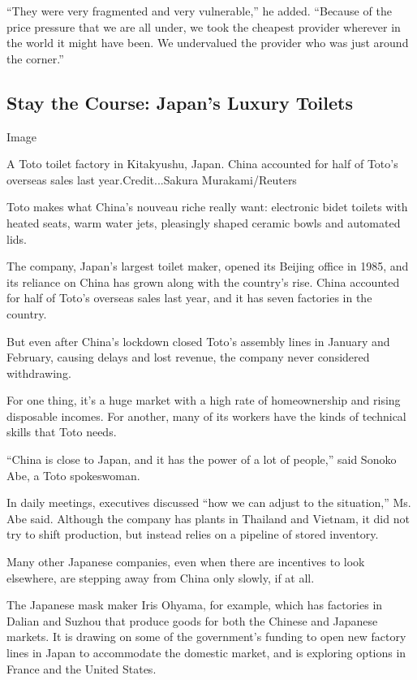 ``They were very fragmented and very vulnerable,'' he added. ``Because
of the price pressure that we are all under, we took the cheapest
provider wherever in the world it might have been. We undervalued the
provider who was just around the corner.''

\hypertarget{stay-the-course-japans-luxury-toilets}{%
\subsection{Stay the Course: Japan's Luxury
Toilets}\label{stay-the-course-japans-luxury-toilets}}

Image

A Toto toilet factory in Kitakyushu, Japan. China accounted for half of
Toto's overseas sales last year.Credit...Sakura Murakami/Reuters

Toto makes what China's nouveau riche really want: electronic bidet
toilets with heated seats, warm water jets, pleasingly shaped ceramic
bowls and automated lids.

The company, Japan's largest toilet maker, opened its Beijing office in
1985, and its reliance on China has grown along with the country's rise.
China accounted for half of Toto's overseas sales last year, and it has
seven factories in the country.

But even after China's lockdown closed Toto's assembly lines in January
and February, causing delays and lost revenue, the company never
considered withdrawing.

For one thing, it's a huge market with a high rate of homeownership and
rising disposable incomes. For another, many of its workers have the
kinds of technical skills that Toto needs.

``China is close to Japan, and it has the power of a lot of people,''
said Sonoko Abe, a Toto spokeswoman.

In daily meetings, executives discussed ``how we can adjust to the
situation,'' Ms. Abe said. Although the company has plants in Thailand
and Vietnam, it did not try to shift production, but instead relies on a
pipeline of stored inventory.

Many other Japanese companies, even when there are incentives to look
elsewhere, are stepping away from China only slowly, if at all.

The Japanese mask maker Iris Ohyama, for example, which has factories in
Dalian and Suzhou that produce goods for both the Chinese and Japanese
markets. It is drawing on some of the government's funding to open new
factory lines in Japan to accommodate the domestic market, and is
exploring options in France and the United States.

